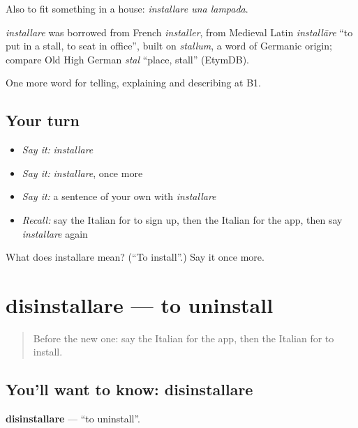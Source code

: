 Also to fit something in a house: \emph{installare una lampada}.

\begin{cousinweb}
\emph{installare} was borrowed from French \emph{installer}, from Medieval Latin \emph{installāre} \textquotedblleft{}to put in a stall, to seat in office\textquotedblright{}, built on \emph{stallum}, a word of Germanic origin; compare Old High German \emph{stal} \textquotedblleft{}place, stall\textquotedblright{} (EtymDB).
\end{cousinweb}

\begin{grammarlens}[title={What you've built}]
One more word for telling, explaining and describing at B1.
\end{grammarlens}

\subsection*{Your turn}
\begin{itemize}
\raggedright
  \item \emph{Say it:} \emph{installare}
  \item \emph{Say it:} \emph{installare}, once more
  \item \emph{Say it:} a sentence of your own with \emph{installare}
  \item \emph{Recall:} say the Italian for to sign up, then the Italian for the app, then say \emph{installare} again
\end{itemize}

\begin{tcolorbox}[breakable,colback=teal!4,colframe=teal!35!black,title={Before you move on}]
What does installare mean? (\textquotedblleft{}To install\textquotedblright{}.) Say it once more.
\end{tcolorbox}
\section[disinstallare]{disinstallare — to uninstall}

\label{lesson:IT-C400-disinstallare}



\begin{quote}
Before the new one: say the Italian for the app, then the Italian for to install.
\end{quote}

\subsection*{You'll want to know: disinstallare}
\textbf{disinstallare} — \textquotedblleft{}to uninstall\textquotedblright{}.

